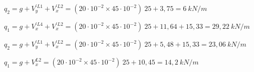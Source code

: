 \begin{resposta}
\begin{enumerate}[start=5]
        $q_2=g+V_{y}^{'L1}+V_{x}^{'L2}=(20 \cdot 10^{-2}\times 45 \cdot 10^{-2})\ 25 +3,75 = 6 \ kN/m$ \newline


        

        $q_1=g+V_{x}^{'L4}+V_{x}^{'L2}=(20 \cdot 10^{-2}\times 45 \cdot 10^{-2})\ 25 +11,64 +15,33 = 29,22 \ kN/m$

        $q_2=g+V_{y}^{'L1}+V_{x}^{'L2}=(20 \cdot 10^{-2}\times 45 \cdot 10^{-2})\ 25 +5,48 +15,33 = 23,06 \ kN/m$ \newline


        

        $q_1=g+V_{x}^{L2}=(20 \cdot 10^{-2}\times 45 \cdot 10^{-2})\ 25 +10,45 = 14,2 \ kN/m$ \newline
        
    \end{enumerate}
\end{resposta}